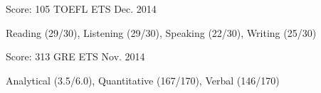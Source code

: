 
\begin{cventries}

  \cventry
    {Score: 105} %
    {TOEFL} %
    {ETS}%
    {Dec. 2014} %
    {
      \begin{cvitems} %
        \item {Reading (29/30), Listening (29/30), Speaking (22/30), Writing (25/30)}
      \end{cvitems}
    }

  \cventry
    {Score: 313} %
    {GRE} %
    {ETS} %
    {Nov. 2014} %
    {
      \begin{cvitems} %
        \item {Analytical (3.5/6.0), Quantitative (167/170), Verbal (146/170)}
      \end{cvitems}
    }
\end{cventries}
